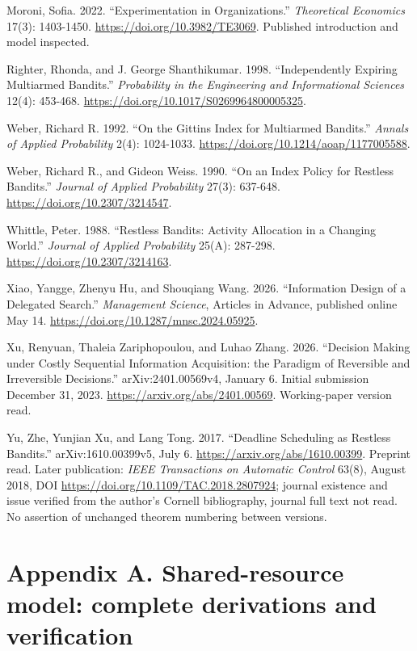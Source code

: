 \documentclass[
  11pt,
]{article}
\begin{document}
{Moroni, Sofia. 2022. ``Experimentation in Organizations.''
\emph{Theoretical Economics} 17(3): 1403-1450.
\url{https://doi.org/10.3982/TE3069}. Published introduction and model
inspected.

Righter, Rhonda, and J. George Shanthikumar. 1998. ``Independently
Expiring Multiarmed Bandits.'' \emph{Probability in the Engineering and
Informational Sciences} 12(4): 453-468.
\url{https://doi.org/10.1017/S0269964800005325}.

Weber, Richard R. 1992. ``On the Gittins Index for Multiarmed Bandits.''
\emph{Annals of Applied Probability} 2(4): 1024-1033.
\url{https://doi.org/10.1214/aoap/1177005588}.

Weber, Richard R., and Gideon Weiss. 1990. ``On an Index Policy for
Restless Bandits.'' \emph{Journal of Applied Probability} 27(3):
637-648. \url{https://doi.org/10.2307/3214547}.

Whittle, Peter. 1988. ``Restless Bandits: Activity Allocation in a
Changing World.'' \emph{Journal of Applied Probability} 25(A): 287-298.
\url{https://doi.org/10.2307/3214163}.

Xiao, Yangge, Zhenyu Hu, and Shouqiang Wang. 2026. ``Information Design
of a Delegated Search.'' \emph{Management Science}, Articles in Advance,
published online May 14. \url{https://doi.org/10.1287/mnsc.2024.05925}.

Xu, Renyuan, Thaleia Zariphopoulou, and Luhao Zhang. 2026. ``Decision
Making under Costly Sequential Information Acquisition: the Paradigm of
Reversible and Irreversible Decisions.'' arXiv:2401.00569v4, January 6.
Initial submission December 31, 2023. \url{https://arxiv.org/abs/2401.00569}.
Working-paper version read.

Yu, Zhe, Yunjian Xu, and Lang Tong. 2017. ``Deadline Scheduling as
Restless Bandits.'' arXiv:1610.00399v5, July 6.
\url{https://arxiv.org/abs/1610.00399}. Preprint read. Later publication:
\emph{IEEE Transactions on Automatic Control} 63(8), August 2018, DOI
\url{https://doi.org/10.1109/TAC.2018.2807924}; journal existence and issue
verified from the author's Cornell bibliography, journal full text not
read. No assertion of unchanged theorem numbering between versions.

}
\clearpage
\section{Appendix A. Shared-resource model: complete derivations and
verification}\label{appendix-a.-shared-resource-model-complete-derivations-and-verification}
\end{document}
